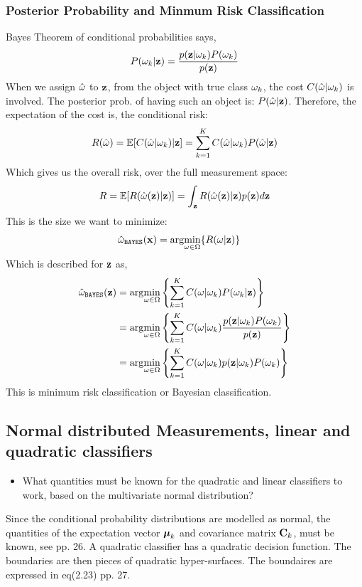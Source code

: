 \subsubsection{Posterior Probability and Minmum Risk Classification}
\label{sub:Posterior Probability}
Bayes Theorem of conditional probabilities says,
\begin{equation}
    P(\omega_k|\mathbf{z}) = \frac{p(\mathbf{z}|\omega_k)P(\omega_k)}{p(\mathbf{z})}
\end{equation}
When we assign $\hat\omega$ to $\mathbf{z}$, from the object with true class $\omega_k$, the cost $C(\hat\omega|\omega_k)$ is involved.
The posterior prob. of having such an object is: $P(\hat\omega|\mathbf{z})$.
Therefore, the expectation of the cost is, the conditional risk:
\begin{equation}
    R(\hat\omega) = \mathbb{E}[C(\hat\omega|\omega_k)|\mathbf{z}] = \sum_{k=1}^K C(\hat\omega|\omega_k) P(\hat\omega|\mathbf{z})
\end{equation}
Which gives us the overall risk, over the full measurement space:
\begin{equation}
    R = \mathbb{E}[R(\hat\omega(\mathbf{z})|\mathbf{z})] = \int_{\mathbf{z}} R(\hat\omega(\mathbf{z})|\mathbf{z})p(\mathbf{z}) d\mathbf{z}
\end{equation}
%
%
This is the size we want to minimize:
\begin{align}
    \hat\omega_\texttt{BAYES}(\mathbf{x})  & = \arg\!\min_{\omega\in\Omega}\{R(\omega|\mathbf{z})\}
\end{align}
Which is described for $\mathbf{z}$ as,
\begin{align*}
    \hat\omega_\texttt{BAYES}(\mathbf{z})  & = \arg\!\min_{\omega\in\Omega}  \left\{ \sum_{k=1}^K C(\omega|\omega_k) P(\omega_k|\mathbf{z})  \right\} \\ 
                                & = \arg\!\min_{ \omega\in\Omega} \left\{ \sum_{k=1}^K C(\omega|\omega_k)\frac{p(\mathbf{z}|\omega_k)P(\omega_k)}{p(\mathbf{z})}  \right\} \\
                                & = \arg\!\min_{ \omega\in\Omega} \left\{ \sum_{k=1}^K C(\omega|\omega_k) p(\mathbf{z}|\omega_k)P(\omega_k)  \right\}
\end{align*}
This is minimum risk classification or Bayesian classification.

\subsection{Normal distributed Measurements, linear and quadratic classifiers}
\label{sub:Normal distributed Measurements, ldc() and qdc()}
\begin{itemize}
    \item What quantities must be known for the quadratic and linear classifiers to work, based on the multivariate normal distribution?
\end{itemize}
Since the conditional probability distributions are modelled as normal, the quantities of the expectation vector $\boldsymbol\mu_k$  and covariance matrix $\mathbf{C}_k$, must be known, see pp. 26.
\newline
A quadratic classifier has a quadratic decision function. The boundaries are then pieces of quadratic hyper-surfaces. The boundaires are expressed in eq(2.23) pp. 27.
\newline
